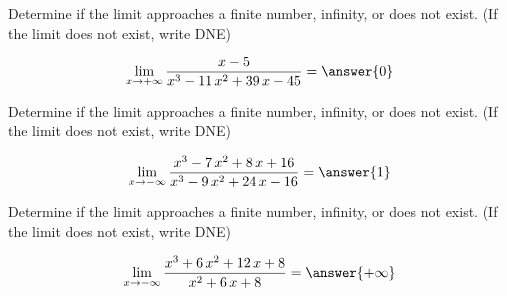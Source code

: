 \documentclass[]{ximera}
\begin{document}
\begin{problem}
Determine if the limit approaches a finite number, infinity, or does not exist. (If the limit does not exist, write DNE)

\[\lim_{x\to{+\infty}}\dfrac{x - 5}{x^{3} - 11 \, x^{2} + 39 \, x - 45}=\answer{0}\]

\end{problem}


\begin{problem}
Determine if the limit approaches a finite number, infinity, or does not exist. (If the limit does not exist, write DNE)

\[\lim_{x\to{-\infty}}\dfrac{x^{3} - 7 \, x^{2} + 8 \, x + 16}{x^{3} - 9 \, x^{2} + 24 \, x - 16}=\answer{1}\]

\end{problem}

\begin{problem}
Determine if the limit approaches a finite number, infinity, or does not exist. (If the limit does not exist, write DNE)

\[\lim_{x\to{-\infty}}\dfrac{x^{3} + 6 \, x^{2} + 12 \, x + 8}{x^{2} + 6 \, x + 8}=\answer{+\infty}\]

\end{problem}
\end{document}
